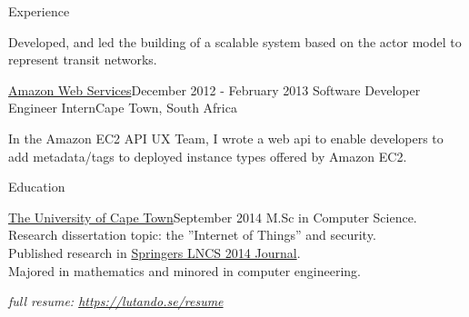 \documentclass{resume} %
\begin{document}
\begin{rSection}{Experience}
\begin{rSubsection}
            \item Developed, and led the building of a scalable system based on the actor model to represent transit
            networks.
                
        \end{rSubsection}

        \begin{rSubsection}
            {\href{https://aws.amazon.com/}{Amazon Web Services}}{December 2012 - February 2013}
            {Software Developer Engineer Intern}{Cape Town, South Africa}
            
            \item In the Amazon EC2 API UX Team, I wrote a web api to enable 
                developers to add metadata/tags to deployed instance types offered by Amazon EC2.
                
        \end{rSubsection}

    \end{rSection}

    
    \begin{rSection}{Education}


        \begin{rSubsection}
            {\href{http://www.uct.ac.za/}{The University of Cape Town}}{September 2014}{}{}
            M.Sc in Computer Science. \\
            Research dissertation topic: the ”Internet of Things” and security. \\
            Published research in \href{https://link.springer.com/chapter/10.1007/978-3-319-13174-0_12}{Springers LNCS 2014 Journal}. \\
            Majored in mathematics and minored in computer engineering. \\
                \begin{center}
                    \textit{full resume: \url{https://lutando.se/resume}}
                \end{center}
        \end{rSubsection}

    \end{rSection}
\end{document}
